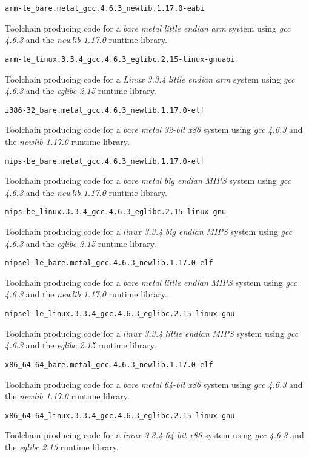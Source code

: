 \begin{description}
\item{\texttt{arm-le\_bare.metal\_gcc.4.6.3\_newlib.1.17.0-eabi}}

  Toolchain producing code for a \emph{bare metal} \emph{little
    endian} \emph{arm} system using \emph{gcc 4.6.3} and the
  \emph{newlib 1.17.0} runtime library.

\item{\texttt{arm-le\_linux.3.3.4\_gcc.4.6.3\_eglibc.2.15-linux-gnuabi}}

  Toolchain producing code for a \emph{Linux 3.3.4} \emph{little
    endian} \emph{arm} system using \emph{gcc 4.6.3} and the
  \emph{eglibc 2.15} runtime library.

\item{\texttt{i386-32\_bare.metal\_gcc.4.6.3\_newlib.1.17.0-elf}}

  Toolchain producing code for a \emph{bare metal} \emph{32-bit}
  \emph{x86} system using \emph{gcc 4.6.3} and the \emph{newlib
    1.17.0} runtime library.

\item{\texttt{mips-be\_bare.metal\_gcc.4.6.3\_newlib.1.17.0-elf}}

  Toolchain producing code for a \emph{bare metal} \emph{big endian}
  \emph{MIPS} system using \emph{gcc 4.6.3} and the \emph{newlib
    1.17.0} runtime library.

\item{\texttt{mips-be\_linux.3.3.4\_gcc.4.6.3\_eglibc.2.15-linux-gnu}}

  Toolchain producing code for a \emph{linux 3.3.4} \emph{big
    endian} \emph{MIPS} system using \emph{gcc 4.6.3} and the
  \emph{eglibc 2.15} runtime library.

\item{\texttt{mipsel-le\_bare.metal\_gcc.4.6.3\_newlib.1.17.0-elf}}


  Toolchain producing code for a \emph{bare metal} \emph{little
    endian} \emph{MIPS} system using \emph{gcc 4.6.3} and the
  \emph{newlib 1.17.0} runtime library.

\item{\texttt{mipsel-le\_linux.3.3.4\_gcc.4.6.3\_eglibc.2.15-linux-gnu}}

  Toolchain producing code for a \emph{linux 3.3.4} \emph{little
    endian} \emph{MIPS} system using \emph{gcc 4.6.3} and the
  \emph{eglibc 2.15} runtime library.

\item{\texttt{x86\_64-64\_bare.metal\_gcc.4.6.3\_newlib.1.17.0-elf}}

  Toolchain producing code for a \emph{bare metal} \emph{64-bit}
  \emph{x86} system using \emph{gcc 4.6.3} and the \emph{newlib
    1.17.0} runtime library.


\item{\texttt{x86\_64-64\_linux.3.3.4\_gcc.4.6.3\_eglibc.2.15-linux-gnu}}

  Toolchain producing code for a \emph{linux 3.3.4} \emph{64-bit}
  \emph{x86} system using \emph{gcc 4.6.3} and the \emph{eglibc 2.15}
  runtime library.
\end{description}
